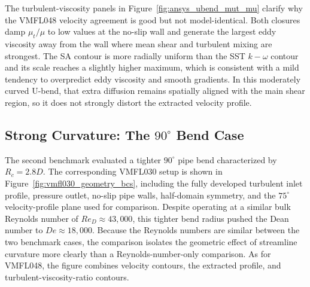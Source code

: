 The turbulent-viscosity panels in Figure~\ref{fig:ansys_ubend_mut_mu} clarify why the VMFL048 velocity agreement is good but not model-identical. Both closures damp $\mu_t/\mu$ to low values at the no-slip wall and generate the largest eddy viscosity away from the wall where mean shear and turbulent mixing are strongest. The SA contour is more radially uniform than the SST $k-\omega$ contour and its scale reaches a slightly higher maximum, which is consistent with a mild tendency to overpredict eddy viscosity and smooth gradients. In this moderately curved U-bend, that extra diffusion remains spatially aligned with the main shear region, so it does not strongly distort the extracted velocity profile.


\subsection{Strong Curvature: The $90^\circ$ Bend Case}
The second benchmark evaluated a tighter $90^\circ$ pipe bend characterized by $R_c = 2.8D$. The corresponding VMFL030 setup is shown in Figure~\ref{fig:vmfl030_geometry_bcs}, including the fully developed turbulent inlet profile, pressure outlet, no-slip pipe walls, half-domain symmetry, and the $75^\circ$ velocity-profile plane used for comparison. Despite operating at a similar bulk Reynolds number of $Re_D \approx 43,000$, this tighter bend radius pushed the Dean number to $De \approx 18,000$. Because the Reynolds numbers are similar between the two benchmark cases, the comparison isolates the geometric effect of streamline curvature more clearly than a Reynolds-number-only comparison. As for VMFL048, the figure combines velocity contours, the extracted profile, and turbulent-viscosity-ratio contours.

